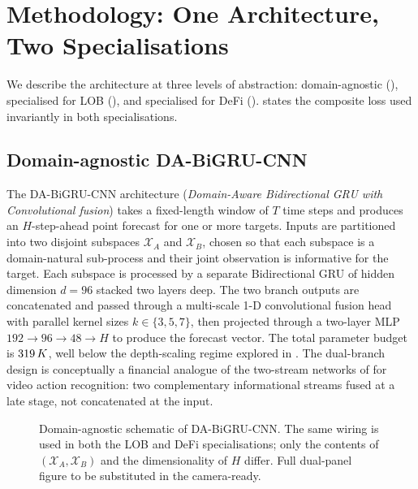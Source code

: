\section{Methodology: One Architecture, Two Specialisations}
\label{sec:methodology}

We describe the architecture at three levels of abstraction:
domain-agnostic (), specialised for LOB
(), and specialised for DeFi
().   states the
composite loss used invariantly in both specialisations.

\subsection{Domain-agnostic DA-BiGRU-CNN}
\label{sec:methodology-abstract}

The DA-BiGRU-CNN architecture
(\emph{Domain-Aware Bidirectional GRU with Convolutional fusion}) takes
a fixed-length window of $T$ time steps and produces an
$H$-step-ahead point forecast for one or more targets.  Inputs are
partitioned into two disjoint subspaces $\mathcal{X}_A$ and
$\mathcal{X}_B$, chosen so that each subspace is a domain-natural
sub-process and their joint observation is informative for the target.
Each subspace is processed by a separate Bidirectional GRU
\cite{cho2014gru} of hidden dimension $d=96$ stacked two layers deep.
The two branch outputs are concatenated and passed through a multi-scale
1-D convolutional fusion head with parallel kernel sizes
$k \in \{3, 5, 7\}$, then projected through a two-layer MLP
$192 \to 96 \to 48 \to H$ to produce the forecast vector.  The total
parameter budget is $319\,K$, well below the depth-scaling regime
explored in \cite{briola2021deep, briola2025microstructure}.  The
dual-branch design is conceptually a financial analogue of the
two-stream networks of \cite{simonyan2014two} for video action
recognition: two complementary informational streams fused at a
late stage, not concatenated at the input.

\begin{figure}[t]
  \centering
  \caption{Domain-agnostic schematic of DA-BiGRU-CNN. The same wiring
    is used in both the LOB and DeFi specialisations; only the contents
    of $(\mathcal{X}_A, \mathcal{X}_B)$ and the dimensionality of $H$
    differ. Full dual-panel figure to be substituted in the
    camera-ready.}
  \label{fig:architecture-dual}
\end{figure}

